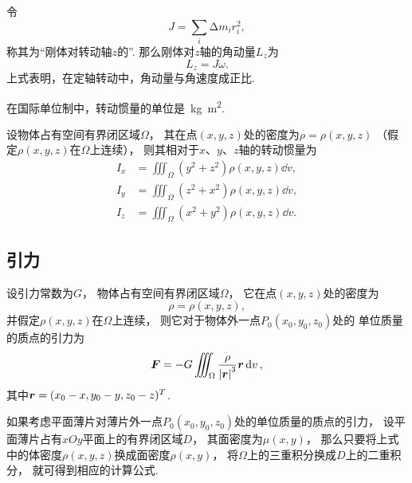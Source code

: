 令\[
	J = \sum_i \increment m_i r_i^2,
\]
称其为“刚体对转动轴\(z\)的”.
那么刚体对\(z\)轴的角动量\(L_z\)为\[
	L_z = J \omega.
\]
上式表明，在定轴转动中，角动量与角速度成正比.

在国际单位制中，转动惯量的单位是~\unit{\kilo\gram.\square\meter}.

\begin{theorem}
设物体占有空间有界闭区域\(\Omega\)，
其在点\((x,y,z)\)处的密度为\(\rho=\rho(x,y,z)\)
（假定\(\rho(x,y,z)\)在\(\Omega\)上连续），
则其相对于\(x\)、\(y\)、\(z\)轴的转动惯量为\begin{align}
	I_x &= \iiint_\Omega (y^2+z^2) \rho(x,y,z) \dd{v}, \\
	I_y &= \iiint_\Omega (z^2+x^2) \rho(x,y,z) \dd{v}, \\
	I_z &= \iiint_\Omega (x^2+y^2) \rho(x,y,z) \dd{v}.
\end{align}
\end{theorem}

\subsection{引力}
\begin{theorem}
设引力常数为\(G\)，
物体占有空间有界闭区域\(\Omega\)，
它在点\((x,y,z)\)处的密度为\[
	\rho=\rho(x,y,z),
\]
并假定\(\rho(x,y,z)\)在\(\Omega\)上连续，
则它对于物体外一点\(P_0(x_0,y_0,z_0)\)处的
单位质量的质点的引力为\begin{equation}
	\boldsymbol{F}
	= -G \iiint_\Omega \frac{\rho}{\abs{\boldsymbol{r}}^3} \boldsymbol{r} \dd{v},
\end{equation}
其中\(\boldsymbol{r}
= (x_0-x,y_0-y,z_0-z)^T\).
\end{theorem}

如果考虑平面薄片对薄片外一点\(P_0(x_0,y_0,z_0)\)处的单位质量的质点的引力，
设平面薄片占有\(xOy\)平面上的有界闭区域\(D\)，
其面密度为\(\mu(x,y)\)，
那么只要将上式中的体密度\(\rho(x,y,z)\)换成面密度\(\rho(x,y)\)，
将\(\Omega\)上的三重积分换成\(D\)上的二重积分，
就可得到相应的计算公式.
